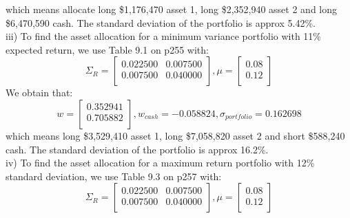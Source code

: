 \documentclass{article}
\begin{document}
which means allocate long \$1,176,470 asset 1, long \$2,352,940 asset 2 and long \$6,470,590 cash. The standard deviation of the portfolio is approx 5.42\%.
\vspace{5mm} \\
iii) To find the asset allocation for a minimum variance portfolio with 11\% expected return, we use Table 9.1 on p255 with:
\begin{equation*}
\Sigma_{R}=%
\begin{bmatrix}{}
 0.022500 & 0.007500 \\ 
  0.007500 & 0.040000 \\ 
  \end{bmatrix},
 \mu = \begin{bmatrix}{} 
0.08 \\
0.12 \\
  \end{bmatrix}
\end{equation*}
We obtain that:
\begin{equation*}
w = %
\begin{bmatrix}{}
 0.352941 \\ 
  0.705882 \\ 
  \end{bmatrix},
w_{cash} = -0.058824,
\sigma_{portfolio} = 0.162698
\end{equation*}
which means long \$3,529,410 asset 1, long \$7,058,820 asset 2 and short \$588,240 cash. The standard deviation of the portfolio is approx 16.2\%.
\vspace{5mm} \\
iv) To find the asset allocation for a maximum return portfolio with 12\% standard deviation, we use Table 9.3 on p257 with:
\begin{equation*}
\Sigma_{R}=%
\begin{bmatrix}{}
 0.022500 & 0.007500 \\ 
  0.007500 & 0.040000 \\ 
  \end{bmatrix},
 \mu = \begin{bmatrix}{} 
0.08 \\
0.12 \\
  \end{bmatrix}
\end{equation*}
\end{document}
